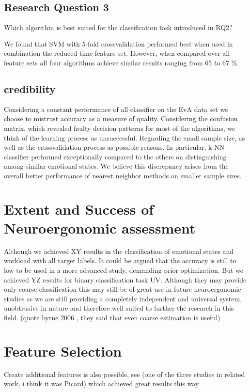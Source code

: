 \subsection{Research Question 3}  
Which algorithm is best suited for the classification task introduced in RQ2?

We found that SVM with 5-fold crossvalidation performed best when used in combination the reduced time feature set. However, when compared over all feature sets all four algorithms achieve similar results ranging from 65 to 67 \%.


\subsection{credibility}
Considering a constant performance of all classifier on the EvA data set we choose to mistrust accuracy as a measure of quality. Considering the confusion matrix, which revealed faulty decision patterns for most of the algorithms, we think of the learning process as unsuccessful. Regarding the small sample size, as well as the crossvalidation process as possible reasons.
In particular, k-NN classifier performed exceptionally compared to the others on distinguishing among similar emotional states. We believe this discrepancy arises from the overall better performance of nearest neighbor methods on smaller sample sizes.
\section{Extent and Success of Neuroergonomic assessment}
Although we achieved XY results in the classification of emotional states and workload with all target labels. It could be argued that the accuracy is still to low to be used in a more advanced study, demanding prior optimization.
But we achieved YZ results for binary classification task UV. Although they may provide only coarse classification this may still be of great use in future neuroergonomic studies as we are still providing a completely independent and universal system, unobtrusive in nature and therefore well suited to further the research in this field. (quote byrne 2006 , they said that even coarse estimation is useful)

\section{Feature Selection}
Create additional features is also possible, see (one of the three studies in related work, i think it was Picard) which achieved great results this way

